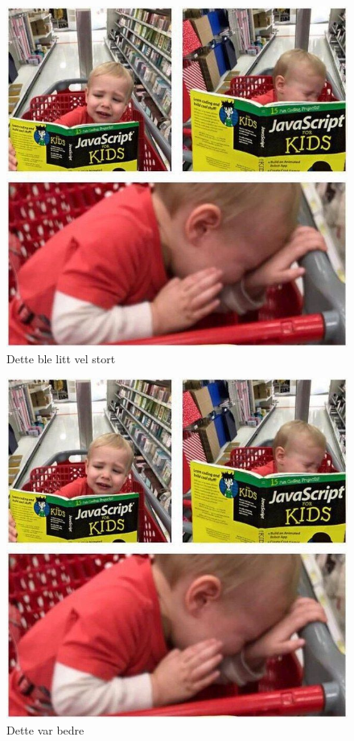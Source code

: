         \begin{figure}[H]
            \centering
            \includegraphics{bilder/JavaScript4kidz.jpg}
            \caption{Dette ble litt vel stort}
            \label{fig:too_large_img}
        \end{figure}
        
        \begin{figure}[H]
            \centering
            \includegraphics[width=.5\textwidth]{bilder/JavaScript4kidz.jpg}
            \caption{Dette var bedre}
            \label{fig:perfectly_normal_img}
        \end{figure}
        
